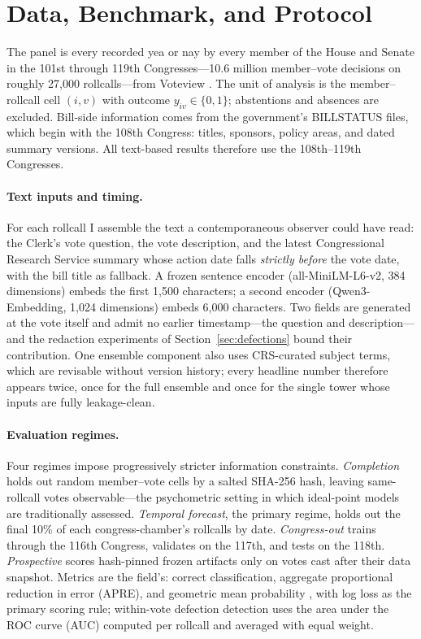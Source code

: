 \documentclass[12pt]{article}
\begin{document}
\section{Data, Benchmark, and Protocol}
\label{sec:data}

The panel is every recorded yea or nay by every member of the House and
Senate in the 101st through 119th Congresses---10.6 million
member--vote decisions on roughly 27,000 rollcalls---from Voteview
\citep{lewis2026voteview}. The unit of analysis is the member--rollcall
cell $(i,v)$ with outcome $y_{iv} \in \{0,1\}$; abstentions and
absences are excluded. Bill-side information comes from the government's
BILLSTATUS files, which begin with the 108th Congress: titles, sponsors,
policy areas, and dated summary versions. All text-based results
therefore use the 108th--119th Congresses.

\paragraph{Text inputs and timing.} For each rollcall I assemble the
text a contemporaneous observer could have read: the Clerk's vote
question, the vote description, and the latest Congressional Research
Service summary whose action date falls \emph{strictly before} the vote
date, with the bill title as fallback. A frozen sentence encoder
(all-MiniLM-L6-v2, 384 dimensions) embeds the first 1,500 characters; a
second encoder (Qwen3-Embedding, 1,024 dimensions) embeds 6,000
characters. Two fields are generated at the vote itself and admit no
earlier timestamp---the question and description---and the redaction
experiments of Section~\ref{sec:defections} bound their contribution.
One ensemble component also uses CRS-curated subject terms, which are
revisable without version history; every headline number therefore
appears twice, once for the full ensemble and once for the single tower
whose inputs are fully leakage-clean.

\paragraph{Evaluation regimes.} Four regimes impose progressively
stricter information constraints. \emph{Completion} holds out random
member--vote cells by a salted SHA-256 hash, leaving same-rollcall votes
observable---the psychometric setting in which ideal-point models are
traditionally assessed. \emph{Temporal forecast}, the primary regime,
holds out the final 10\% of each congress-chamber's rollcalls by date.
\emph{Congress-out} trains through the 116th Congress, validates on the
117th, and tests on the 118th. \emph{Prospective} scores hash-pinned
frozen artifacts only on votes cast after their data snapshot. Metrics
are the field's: correct classification, aggregate proportional
reduction in error (APRE), and geometric mean probability
\citep{carroll2013structure}, with log loss as the primary scoring
rule; within-vote defection detection uses the area under the ROC curve
(AUC) computed per rollcall and averaged with equal weight.
\end{document}
